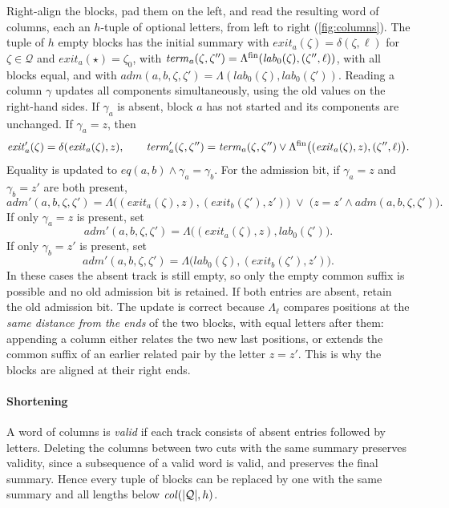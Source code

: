 Right-align the blocks, pad them on the left, and read the resulting word of columns, each an
$h$-tuple of optional letters, from left to right (\cref{fig:columns}). The tuple of $h$ empty blocks has
the initial summary with $\mathit{exit}_a(\zeta) = \delta(\zeta,\ell)$ for $\zeta \in \mathcal Q$ and
$\mathit{exit}_a(\star) = \zeta_0$, with $\mathit{term}_a(\zeta,\zeta'') =
\Lambda^{\mathrm{fin}}(\mathit{lab}_0(\zeta),(\zeta'',\ell))$, with all blocks equal, and with
$\mathit{adm}(a,b,\zeta,\zeta') = \Lambda(\mathit{lab}_0(\zeta),\mathit{lab}_0(\zeta'))$. Reading a column
$\gamma$ updates all components simultaneously, using the old values on the right-hand sides. If $\gamma_a$ is absent, block $a$ has not started and its
components are unchanged. If $\gamma_a = z$, then
\[
  \mathit{exit}'_a(\zeta) = \delta(\mathit{exit}_a(\zeta),z),\qquad
  \mathit{term}'_a(\zeta,\zeta'') = \mathit{term}_a(\zeta,\zeta'') \vee
     \Lambda^{\mathrm{fin}}\bigl((\mathit{exit}_a(\zeta),z),(\zeta'',\ell)\bigr).
\]
Equality is updated to $\mathit{eq}(a,b) \wedge \gamma_a = \gamma_b$. For the admission bit, if
$\gamma_a = z$ and $\gamma_b = z'$ are both present,
\[
  \mathit{adm}'(a,b,\zeta,\zeta') =
  \Lambda\bigl((\mathit{exit}_a(\zeta),z),(\mathit{exit}_b(\zeta'),z')\bigr)
  \;\vee\; \bigl(z = z' \wedge \mathit{adm}(a,b,\zeta,\zeta')\bigr).
\]
If only $\gamma_a=z$ is present, set
\[
 \mathit{adm}'(a,b,\zeta,\zeta')=
 \Lambda\bigl((\mathit{exit}_a(\zeta),z),\mathit{lab}_0(\zeta')\bigr).
\]
If only $\gamma_b=z'$ is present, set
\[
 \mathit{adm}'(a,b,\zeta,\zeta')=
 \Lambda\bigl(\mathit{lab}_0(\zeta),(\mathit{exit}_b(\zeta'),z')\bigr).
\]
In these cases the absent track is still empty, so only the empty common
suffix is possible and no old admission bit is retained. If both entries
are absent, retain the old admission bit. The update is correct because $\Lambda_\ell$ compares positions at the \emph{same
distance from the ends} of the two blocks, with equal letters after them: appending a column
either relates the two new last positions, or extends the common suffix of an earlier related
pair by the letter $z = z'$. This is why the blocks are aligned at their right ends.

\paragraph{Shortening}
A word of columns is \emph{valid} if each track consists of absent entries followed by
letters. Deleting the columns between two cuts with the same summary preserves validity,
since a subsequence of a valid word is valid, and preserves the final summary. Hence every
tuple of blocks can be replaced by one with the same summary and all lengths below
$\mathit{col}(\lvert \mathcal Q\rvert,h)$.

